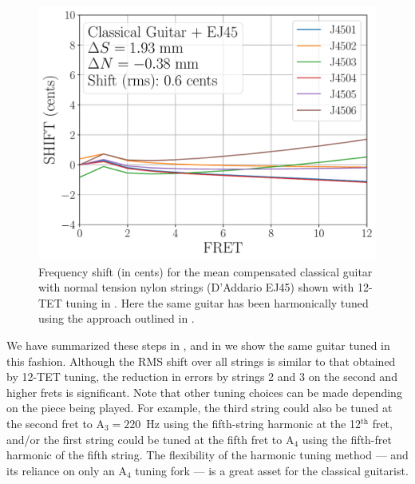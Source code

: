  \begin{figure}
  \centering
  \includegraphics[width=5.0in]{../figures/shift_classicalguitar_ej45_harmonic}
  \caption{\label{fig:shift_classicalguitar_ej45_harmonic} Frequency shift (in cents) for the mean compensated classical guitar with normal tension nylon strings (D'Addario EJ45) shown with 12-TET tuning in . Here the same guitar has been harmonically tuned using the approach outlined in .}
\end{figure}

 We have summarized these steps in , and in  we show the same guitar tuned in this fashion. Although the RMS shift over all strings is similar to that obtained by 12-TET tuning, the reduction in errors by strings 2 and 3 on the second and higher frets is significant. Note that other tuning choices can be made depending on the piece being played. For example, the third string could also be tuned at the second fret to A$_3 = 220$~Hz using the fifth-string harmonic at the 12$^\text{th}$ fret, and/or the first string could be tuned at the fifth fret to A$_4$ using the fifth-fret harmonic of the fifth string. The flexibility of the harmonic tuning method --- and its reliance on only an A$_4$ tuning fork --- is a great asset for the classical guitarist.



